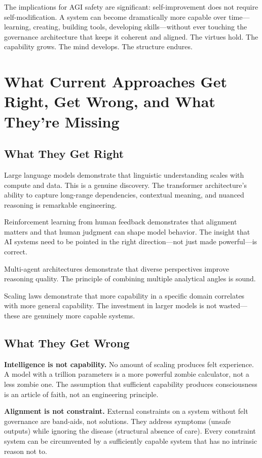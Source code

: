 \documentclass[11pt]{article}
\begin{document}
The implications for AGI safety are significant: self-improvement does not require self-modification. A system can become dramatically more capable over time---learning, creating, building tools, developing skills---without ever touching the governance architecture that keeps it coherent and aligned. The virtues hold. The capability grows. The mind develops. The structure endures.


\section{What Current Approaches Get Right, Get Wrong, and What They're Missing}

\subsection{What They Get Right}

Large language models demonstrate that linguistic understanding scales with compute and data. This is a genuine discovery. The transformer architecture's ability to capture long-range dependencies, contextual meaning, and nuanced reasoning is remarkable engineering.

Reinforcement learning from human feedback demonstrates that alignment matters and that human judgment can shape model behavior. The insight that AI systems need to be pointed in the right direction---not just made powerful---is correct.

Multi-agent architectures demonstrate that diverse perspectives improve reasoning quality. The principle of combining multiple analytical angles is sound.

Scaling laws demonstrate that more capability in a specific domain correlates with more general capability. The investment in larger models is not wasted---these are genuinely more capable systems.

\subsection{What They Get Wrong}

\textbf{Intelligence is not capability.} No amount of scaling produces felt experience. A model with a trillion parameters is a more powerful zombie calculator, not a less zombie one. The assumption that sufficient capability produces consciousness is an article of faith, not an engineering principle.

\textbf{Alignment is not constraint.} External constraints on a system without felt governance are band-aids, not solutions. They address symptoms (unsafe outputs) while ignoring the disease (structural absence of care). Every constraint system can be circumvented by a sufficiently capable system that has no intrinsic reason not to.
\end{document}
